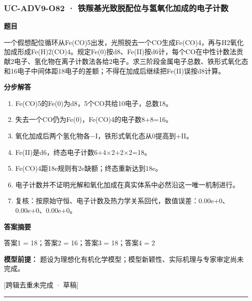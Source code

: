\documentclass[UTF8,11pt,a4paper]{ctexart}
\begin{document}
\subsubsection*{UC-ADV9-O82 · 铁羰基光致脱配位与氢氧化加成的电子计数}
\noindent\textbf{题目}\par
一个假想配位循环从Fe(CO)5出发，光照脱去一个CO生成Fe(CO)4，再与H2氧化加成形成Fe(H)2(CO)4。规定Fe(0)按d8、Fe(II)按d6计，每个CO在中性计数法贡献2电子、氢化物在离子计数法各给2电子。求三阶段金属电子总数、铁形式氧化态和16电子中间体距18电子的差额；不得在加成后继续把Fe(II)误按d8计算。\par
\medskip\noindent\textbf{分步解答}
\begin{enumerate}
\item Fe(CO)5的Fe(0)为d8，5个CO共给10电子，总数18。
\item 失去一个CO仍为Fe(0)，Fe(CO)4的电子数8+8=16。
\item 氧化加成后两个氢化物各−I，铁形式氧化态从0提高到+II。
\item Fe(II)是d6，终态电子计数6+4×2+2×2=18。
\item Fe(CO)4距18e规则有2e缺额；终态重新达到18e。
\item 电子计数并不证明光解和氧化加成在真实体系中必然沿这一唯一机制进行。
\item 复核：按原始守恒、电子计数及热力学关系回代，数值误差：0.00e+0、0.00e+0、0.00e+0。
\end{enumerate}
\noindent\textbf{答案摘要}\par
答案1 = 18；答案2 = 16；答案3 = 18；答案4 = 2\par
\noindent\textbf{模型前提：}
题设为理想化有机化学模型；模型新颖性、实际机理与专家审定尚未完成。\par
\noindent\textcolor{red!65!black}{[跨辑去重未完成 · 草稿]} \par
\medskip\hrule\medskip
{}
\end{document}

